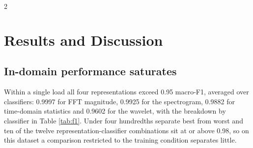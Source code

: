\documentclass[12pt,twoside,titlepage]{ingenius}
\begin{document}
\begin{multicols}{2}
\section{Results and Discussion}

\subsection{In-domain performance saturates}

Within a single load all four representations exceed 0.95 macro-F1, averaged
over classifiers: 0.9997 for FFT magnitude, 0.9925 for the spectrogram, 0.9882
for time-domain statistics and 0.9602 for the wavelet, with the breakdown by
classifier in Table \ref{tab:f1}. Under four hundredths separate best from worst
and ten of the twelve representation-classifier combinations sit at or above
0.98, so on this dataset a comparison restricted to the training condition
separates little.


\end{multicols}
\end{document}
